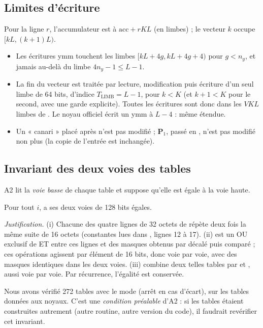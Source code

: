 \subsection{Limites d'écriture}
Pour la ligne $r$, l'accumulateur est à $\mathrm{acc}+rKL$ (en limbes) ; le vecteur $k$ occupe $[kL,(k+1)L)$.
\begin{itemize}
\item \Pc{} Les écritures ymm touchent les limbes $[kL+4g,kL+4g+4)$ pour $g<n_y$, et jamais au-delà du limbe $4n_y-1\le L-1$.
\item \Pc{} La fin du vecteur est traitée par lecture, modification puis écriture d'un seul limbe de 64 bits, d'indice $T_{\mathrm{LIMB}}=L-1$, pour $k<K$ (et $k+1<K$ pour le second, avec une garde explicite). Toutes les écritures sont donc dans les $VKL$ limbes de . Le noyau officiel écrit un ymm à $L-4$ : même étendue.
\item \Pe{} Un « canari » placé après  n'est pas modifié ; $\mathbf{P}_1$, passé en , n'est pas modifié non plus (la copie de l'entrée est inchangée).
\end{itemize}

\subsection{Invariant des deux voies des tables}
A2 lit la \emph{voie basse} de chaque table et suppose qu'elle est égale à la voie haute.
\begin{lemme}\label{lem:voies}\Pc{} Pour tout $i$,  a ses deux voies de 128 bits égales.
\end{lemme}
\emph{Justification.} (i) Chacune des quatre lignes de 32 octets de  répète deux fois la même suite de 16 octets (constantes lues dans , lignes 12 à 17). (ii)  est un OU exclusif de ET entre ces lignes et des masques obtenus par  décalé puis comparé ; ces opérations agissent par élément de 16 bits, donc voie par voie, avec des masques identiques dans les deux voies. (iii)  combine deux telles tables par \code{^} et , aussi voie par voie. Par récurrence, l'égalité est conservée.

\Pe{} Nous avons vérifié 272 tables avec le mode  (arrêt en cas d'écart), sur les tables données aux noyaux. C'est une \emph{condition préalable} d'A2 : si les tables étaient construites autrement (autre routine, autre version du code), il faudrait revérifier cet invariant.

